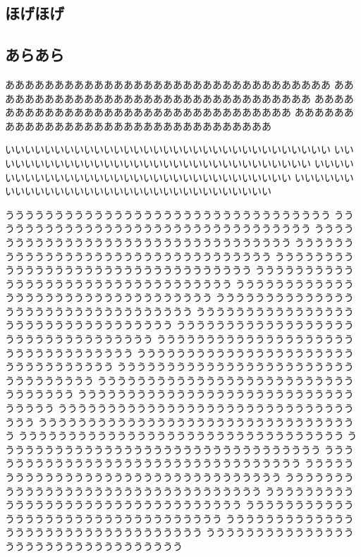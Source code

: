 \documentclass{jbook}
\begin{document}
\begin{nomarginparseprule}
\chapter{ほげほげ}
\section{あらあら}
\mbox{}
\end{nomarginparseprule}
あああああああああああああああああああああああああああああああああ
あああああああああああああああああああああああああああああああああ
あああああああああああああああああああああああああああああああああ
あああああああああああああああああああああああああああああああああ

いいいいいいいいいいいいいいいいいいいいいいいいいいいいいいいいい
いいいいいいいいいいいいいいいいいいいいいいいいいいいいいいいいい
いいいいいいいいいいいいいいいいいいいいいいいいいいいいいいいいい
いいいいいいいいいいいいいいいいいいいいいいいいいいいいいいいいい

ううううううううううううううううううううううううううううううううう
ううううううううううううううううううううううううううううううううう
ううううううううううううううううううううううううううううううううう
ううううううううううううううううううううううううううううううううう
ううううううううううううううううううううううううううううううううう
ううううううううううううううううううううううううううううううううう
ううううううううううううううううううううううううううううううううう
ううううううううううううううううううううううううううううううううう
ううううううううううううううううううううううううううううううううう
ううううううううううううううううううううううううううううううううう
ううううううううううううううううううううううううううううううううう
ううううううううううううううううううううううううううううううううう
ううううううううううううううううううううううううううううううううう
ううううううううううううううううううううううううううううううううう
ううううううううううううううううううううううううううううううううう
ううううううううううううううううううううううううううううううううう
ううううううううううううううううううううううううううううううううう
ううううううううううううううううううううううううううううううううう
ううううううううううううううううううううううううううううううううう
ううううううううううううううううううううううううううううううううう
ううううううううううううううううううううううううううううううううう
ううううううううううううううううううううううううううううううううう
ううううううううううううううううううううううううううううううううう
ううううううううううううううううううううううううううううううううう
ううううううううううううううううううううううううううううううううう
ううううううううううううううううううううううううううううううううう
\end{document}
